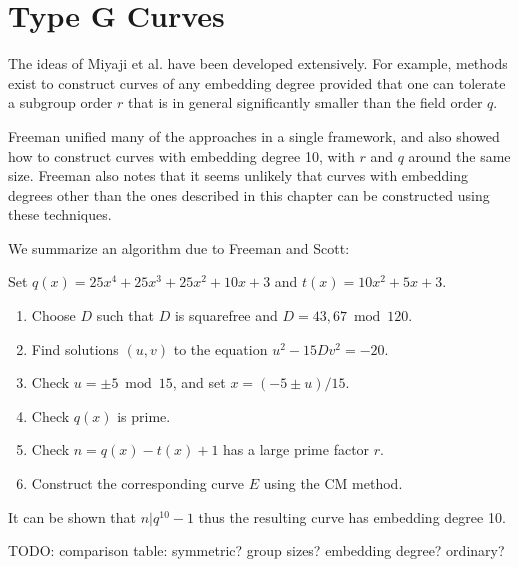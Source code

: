 \section {Type G Curves}

The ideas of Miyaji et al. have been developed extensively\cite{alotofstuff}.
For example, methods exist to construct curves of any embedding degree
provided that one can tolerate a subgroup order $r$ that is
in general significantly smaller than the field order $q$.

Freeman unified many of the approaches in a single
framework\cite{freeman}, and also showed how to construct curves with
embedding degree 10, with $r$ and $q$ around the same size.
Freeman also notes that it seems unlikely that curves
with embedding degrees other than the ones described in this chapter
can be constructed using these techniques.

We summarize an algorithm due to Freeman and Scott:

Set $q(x) = 25x^4 + 25x^3 + 25x^2 + 10x + 3$ and
$t(x) = 10x^2 + 5x + 3$.

\begin{enumerate}
\item
Choose $D$ such that $D$ is squarefree and $D = 43, 67 \bmod 120$.
\item
Find solutions $(u,v)$ to the equation $u^2 - 15 Dv^2 = -20$.
\item
Check $u = \pm 5 \bmod 15$,
and set $x = (-5 \pm u)/15$.
\item
Check $q(x)$ is prime.
\item
Check $n = q(x) - t(x) + 1$ has a large prime factor $r$.
\item
Construct the corresponding curve $E$ using the CM method.
\end{enumerate}

It can be shown that $n | q^{10} - 1$ thus the resulting curve has
embedding degree 10.

TODO: comparison table: symmetric? group sizes? embedding degree? ordinary?
